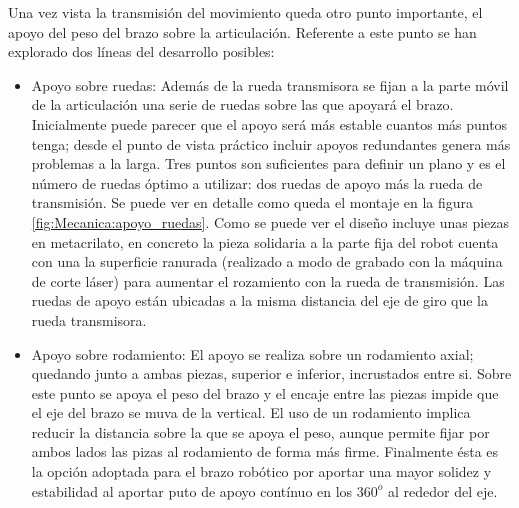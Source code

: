 	Una vez vista la transmisión del movimiento queda otro punto importante, el apoyo del peso del brazo sobre la articulación. Referente a este punto se han explorado dos líneas del desarrollo posibles:
    \begin{itemize}
        \item Apoyo sobre ruedas: Además de la rueda transmisora se fijan a la parte móvil de la articulación una serie de ruedas sobre las que apoyará el brazo. Inicialmente puede parecer que el apoyo será más estable cuantos más puntos tenga; desde el punto de vista práctico incluir apoyos redundantes genera más problemas a la larga. Tres puntos son suficientes para definir un plano y es el número de ruedas óptimo a utilizar: dos ruedas de apoyo más la rueda de transmisión. Se puede ver en detalle como queda el montaje en la figura \ref{fig:Mecanica:apoyo_ruedas}. Como se puede ver el diseño incluye unas piezas en metacrilato, en concreto la pieza solidaria a la parte fija del robot cuenta con una la superficie ranurada (realizado a modo de grabado con la máquina de corte láser) para aumentar el rozamiento con la rueda de transmisión. Las ruedas de apoyo están ubicadas a la misma distancia del eje de giro que la rueda transmisora.
        \item Apoyo sobre rodamiento: El apoyo se realiza sobre un rodamiento axial; quedando junto a ambas piezas, superior e inferior, incrustados entre si. Sobre este punto se apoya el peso del brazo y el encaje entre las piezas impide que el eje del brazo se muva de la vertical. El uso de un rodamiento implica reducir la distancia sobre la que se apoya el peso, aunque permite fijar por ambos lados las pizas al rodamiento de forma más firme. Finalmente ésta es la opción adoptada para el brazo robótico por aportar una mayor solidez y estabilidad al aportar puto de apoyo contínuo en los $360^o$ al rededor del eje.
    \end{itemize}

